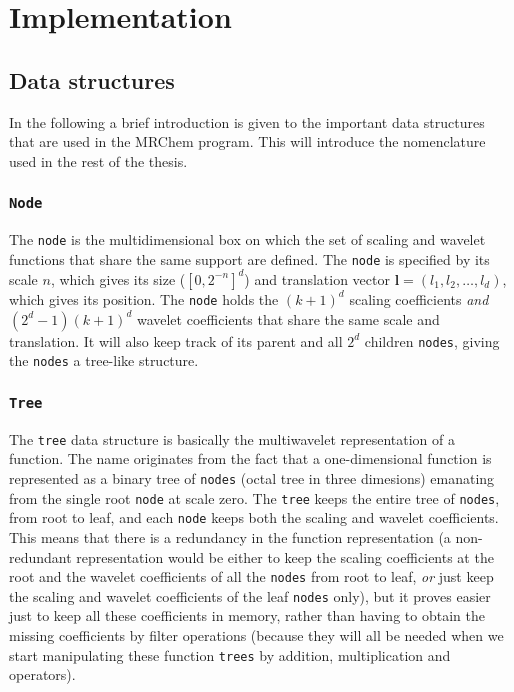 \chapter{Implementation}\label{chap:implementation}
\section{Data structures}
In the following a brief introduction is given to the important data structures
that are used in the MRChem program. This will introduce the nomenclature used 
in the rest of the thesis. 

\subsection*{\texttt{Node}}
The \texttt{node} is the multidimensional box on which the set of
scaling and wavelet functions that share the same support are defined. The 
\texttt{node} is specified by its scale $n$, which gives its size 
($[0,2^{-n}]^d$) and translation vector 
$\boldsymbol{l} = (l_1,l_2,\dots,l_d)$, which gives its position. 
The \texttt{node} holds the $(k+1)^d$ scaling coefficients \emph{and}
$(2^d-1)(k+1)^d$ wavelet coefficients that share the same scale and
translation. It will also keep track of its parent and all $2^d$ children
\texttt{nodes}, giving the \texttt{nodes} a tree-like structure.

\subsection*{\texttt{Tree}}
The \texttt{tree} data structure is basically the multiwavelet representation 
of a function. The name originates from the fact that a one-dimensional 
function is represented as a binary tree of \texttt{nodes} (octal tree in 
three dimesions) emanating from the single root \texttt{node} at scale zero.
The \texttt{tree} keeps the entire tree of \texttt{nodes}, from root to leaf,
and each \texttt{node} keeps both the scaling and wavelet coefficients. This
means that there is a redundancy in the function representation (a
non-redundant representation would be either to keep the scaling coefficients 
at the root and the wavelet coefficients of all the \texttt{nodes} from root to
leaf, \emph{or} just keep the scaling and wavelet coefficients of the leaf
\texttt{nodes} only), but it proves easier just to keep all these coefficients
in memory, rather than having to obtain the missing coefficients by filter
operations (because they will all be needed when we start manipulating these
function \texttt{trees} by addition, multiplication and operators).


